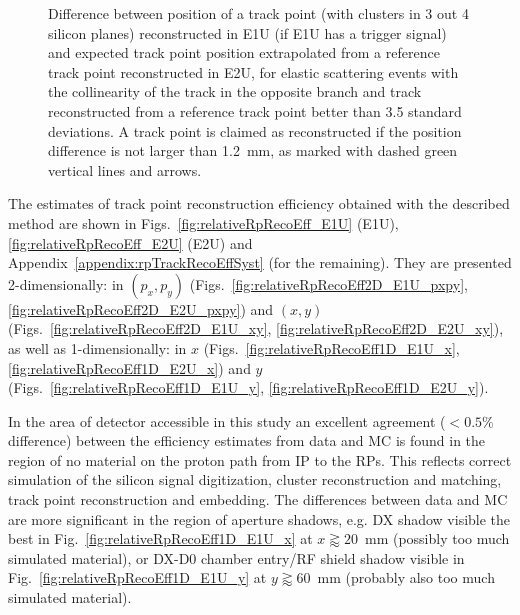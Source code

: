 \begin{figure}[h]
{\begin{subfigure}[b]{\linewidth}
  \end{subfigure}
}%
\caption[Difference between measured and extrapolated position of track point in E1U.]%
    {Difference between position of a track point (with clusters in 3 out 4 silicon planes) reconstructed in E1U (if E1U has a trigger signal) and expected track point position extrapolated from a reference track point reconstructed in E2U, for elastic scattering events with the collinearity of the track in the opposite branch and track reconstructed from a reference track point better than 3.5 standard deviations. A track point is claimed as reconstructed if the position difference is not larger than 1.2~mm, as marked with dashed green vertical lines and arrows.}\label{fig:rpSystPositionDifference}%
\end{figure}

The estimates of track point reconstruction efficiency obtained with the described method are shown in Figs.~\ref{fig:relativeRpRecoEff_E1U} (E1U), \ref{fig:relativeRpRecoEff_E2U} (E2U) and Appendix~\ref{appendix:rpTrackRecoEffSyst} (for the remaining). They are presented 2-dimensionally: in $(p_{x},p_{y})$ (Figs.~\ref{fig:relativeRpRecoEff2D_E1U_pxpy}, \ref{fig:relativeRpRecoEff2D_E2U_pxpy}) and $(x,y)$ (Figs.~\ref{fig:relativeRpRecoEff2D_E1U_xy}, \ref{fig:relativeRpRecoEff2D_E2U_xy}), as well as 1-dimensionally: in $x$ (Figs.~\ref{fig:relativeRpRecoEff1D_E1U_x}, \ref{fig:relativeRpRecoEff1D_E2U_x}) and $y$ (Figs.~\ref{fig:relativeRpRecoEff1D_E1U_y}, \ref{fig:relativeRpRecoEff1D_E2U_y}).


In the area of detector accessible in this study an excellent agreement ($<0.5\%$ difference) between the efficiency estimates from data and MC is found in the region of no material on the proton path from IP to the RPs. This reflects correct simulation of the silicon signal digitization, cluster reconstruction and matching, track point reconstruction and embedding. The differences between data and MC are more significant in the region of aperture shadows, e.g. DX shadow visible the best in Fig.~\ref{fig:relativeRpRecoEff1D_E1U_x} at $x \gtrapprox 20$~mm (possibly too much simulated material), or DX-D0 chamber entry/RF shield shadow visible in Fig.~\ref{fig:relativeRpRecoEff1D_E1U_y} at $y \gtrapprox 60$~mm (probably also too much simulated material).

